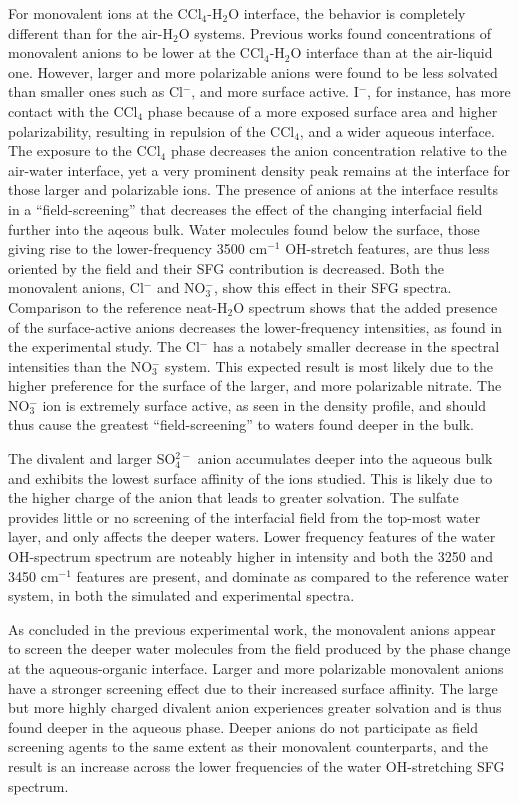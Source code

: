 For monovalent ions at the CCl$_4$-H$_2$O interface, the behavior is completely different than for the air-H$_2$O systems. Previous works found concentrations of monovalent anions to be lower at the CCl$_4$-H$_2$O interface than at the air-liquid one.\cite{Wick2007a} However, larger and more polarizable anions were found to be less solvated than smaller ones such as Cl$^-$, and more surface active.  I$^-$, for instance, has more contact with the CCl$_4$ phase because of a more exposed surface area and higher polarizability, resulting in repulsion of the CCl$_4$, and a wider aqueous interface. The exposure to the CCl$_4$ phase decreases the anion concentration relative to the air-water interface, yet a very prominent density peak remains at the interface for those larger and polarizable ions. The presence of anions at the interface results in a ``field-screening'' that decreases the effect of the changing interfacial field further into the aqeous bulk. Water molecules found below the surface, those giving rise to the lower-frequency 3500 cm$^{-1}$ OH-stretch features, are thus less oriented by the field and their SFG contribution is decreased. Both the monovalent anions, Cl$^-$ and NO$_3^-$, show this effect in their SFG spectra. Comparison to the reference neat-H$_2$O spectrum shows that the added presence of the surface-active anions decreases the lower-frequency intensities, as found in the experimental study. The Cl$^-$ has a notabely smaller decrease in the spectral intensities than the NO$_3^-$ system. This expected result is most likely due to the higher preference for the surface of the larger, and more polarizable nitrate. The NO$_3^-$ ion is extremely surface active, as seen in the density profile, and should thus cause the greatest ``field-screening'' to waters found deeper in the bulk.

The divalent and larger SO$_4^{2-}$ anion accumulates deeper into the aqueous bulk and exhibits the lowest surface affinity of the ions studied. This is likely due to the higher charge of the anion that leads to greater solvation. The sulfate provides little or no screening of the interfacial field from the top-most water layer, and only affects the deeper waters. Lower frequency features of the water OH-spectrum spectrum are noteably higher in intensity and both the 3250 and 3450 cm$^{-1}$ features are present, and dominate as compared to the reference water system, in both the simulated and experimental spectra.

As concluded in the previous experimental work, the monovalent anions appear to screen the deeper water molecules from the field produced by the phase change at the aqueous-organic interface. Larger and more polarizable monovalent anions have a stronger screening effect due to their increased surface affinity. The large but more highly charged divalent anion experiences greater solvation and is thus found deeper in the aqueous phase. Deeper anions do not participate as field screening agents to the same extent as their monovalent counterparts, and the result is an increase across the lower frequencies of the water OH-stretching SFG spectrum.
